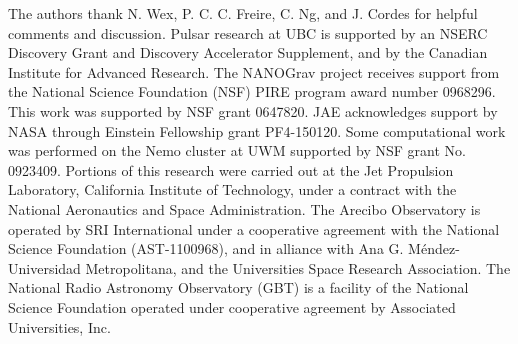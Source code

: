 \documentclass[iop,apj,tighten]{emulateapj}
\begin{document}






\acknowledgements
The authors thank N. Wex, P. C. C. Freire, C. Ng, and J. Cordes for
helpful comments and discussion.
Pulsar research at UBC is supported by an NSERC Discovery Grant and Discovery
Accelerator Supplement, and by the Canadian Institute for Advanced Research.
The NANOGrav project receives support from the National Science Foundation
(NSF) PIRE program award number 0968296. This work was supported by NSF grant 0647820.
JAE acknowledges support by NASA through Einstein Fellowship grant PF4-150120. 
Some computational work was performed on the Nemo cluster at UWM supported 
by NSF grant No. 0923409. Portions of this research were carried out at the 
Jet Propulsion Laboratory, California Institute of Technology, under a contract 
with the National Aeronautics and Space Administration. 
The Arecibo Observatory is operated by SRI International under a cooperative
agreement with the National Science Foundation (AST-1100968), and in alliance
with Ana G. Méndez-Universidad Metropolitana, and the Universities Space
Research Association.  The National Radio Astronomy Observatory (GBT) is a
facility of the National Science Foundation operated under cooperative
agreement by Associated Universities, Inc.
\end{document}
